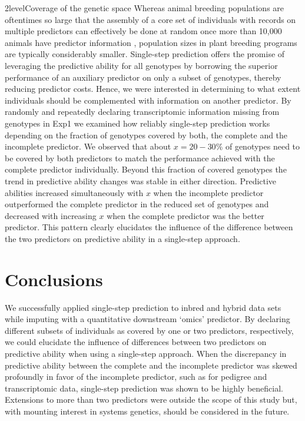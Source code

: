\documentclass[12pt,titlepage]{article}
\begin{document}
\Genetics2level{Coverage of the genetic space}
Whereas animal breeding populations are oftentimes so large that the assembly 
of a core set of individuals with records on multiple predictors can effectively 
be done at random once more than 10,000 animals have predictor information
\cite{Fragomeni2015,Lourenco2015,Masuda2016}, population sizes in plant breeding 
programs are typically considerably smaller.
Single-step prediction offers the promise of leveraging the predictive ability
for all genotypes by borrowing the superior performance of an auxiliary
predictor on only a subset of genotypes, thereby reducing predictor costs.
Hence, we were interested in determining to what extent individuals should be 
complemented with information on another predictor.
By randomly and repeatedly declaring transcriptomic information missing from
genotypes in Exp1 we examined how reliably single-step prediction works
depending on the fraction of genotypes covered by both, the complete and the
incomplete predictor.
We observed that about $x=20-30\%$ of genotypes need to be covered by both
predictors to match the performance achieved with the complete predictor
individually.
Beyond this fraction of covered genotypes the trend in predictive ability
changes was stable in either direction.
Predictive abilities increased simultaneously with $x$ when the incomplete
predictor outperformed the complete predictor in the reduced set of genotypes
and decreased with increasing $x$ when the complete predictor was the better
predictor.
This pattern clearly elucidates the influence of the difference between the
two predictors on predictive ability in a single-step approach.



\section*{Conclusions}
We successfully applied single-step prediction to inbred and hybrid data sets
while imputing with a quantitative downstream `omics' predictor.
By declaring different subsets of individuals as covered by one or two 
predictors, respectively, we could elucidate the influence of differences
between two predictors on predictive ability when using a single-step
approach.
When the discrepancy in predictive ability between the complete and the
incomplete predictor was skewed profoundly in favor of the incomplete predictor,
such as for pedigree and transcriptomic data, single-step prediction was shown
to be highly beneficial.
Extensions to more than two predictors were outside the scope of this study
but, with mounting interest in systems genetics, should be considered in the
future.
\end{document}
